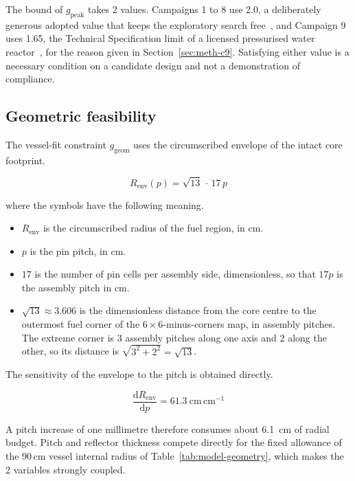 The bound of $g_\mathrm{peak}$ takes 2 values. Campaigns 1 to 8 use
2.0, a deliberately generous adopted value that keeps the exploratory
search free~\cite{epr_fsar_ch4}, and Campaign 9 uses 1.65, the
Technical Specification limit of a licensed pressurised water
reactor~\cite{robinson_gd10}, for the reason given in
Section~\ref{sec:meth-c9}. Satisfying either value is a necessary
condition on a candidate design and not a demonstration of compliance.

\subsection{Geometric feasibility}
\label{sec:meth-geom}

The vessel-fit constraint $g_\mathrm{geom}$ uses the circumscribed
envelope of the intact core footprint.

\begin{equation}
R_\mathrm{env}(p) = \sqrt{13}\,\cdot\,17\,p
\label{eq:renv}
\end{equation}

\noindent where the symbols have the following meaning.

\begin{itemize}
  \item $R_\mathrm{env}$ is the circumscribed radius of the fuel
        region, in cm.

  \item $p$ is the pin pitch, in cm.

  \item $17$ is the number of pin cells per assembly side,
        dimensionless, so that $17p$ is the assembly pitch in cm.

  \item $\sqrt{13} \approx 3.606$ is the dimensionless distance from
        the core centre to the outermost fuel corner of the
        $6\times6$-minus-corners map, in assembly pitches. The extreme
        corner is 3 assembly pitches along one axis and 2 along
        the other, so its distance is $\sqrt{3^2 + 2^2} = \sqrt{13}$.
\end{itemize}

The sensitivity of the envelope to the pitch is obtained directly.

\begin{equation}
\frac{\mathrm{d}R_\mathrm{env}}{\mathrm{d}p} = 61.3~\mathrm{cm\,cm^{-1}}
\label{eq:drenv}
\end{equation}

A pitch increase of one millimetre therefore consumes about
\SI{6.1}{cm} of radial budget. Pitch and reflector thickness compete
directly for the fixed allowance of the 90\,cm vessel internal radius
of Table~\ref{tab:model-geometry}, which makes the 2 variables
strongly coupled.

